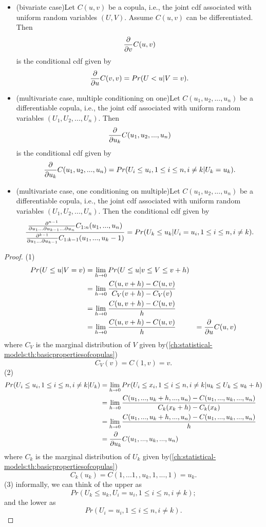 \begin{refsection}
\begin{theorem}\label{ch:statistical-models:th:partialDifferentialCopulaGivesConditionalDistributionForUniformRandomVariables}\cite[16]{schmitz2003copulas}
\begin{itemize}
	\item (bivariate case)Let $C(u,v)$ be a copula, i.e., the joint cdf  associated with uniform random variables $(U,V)$. Assume $C(u,v)$ can be differentiated. Then
	$$\frac{\partial}{\partial v}C(u,v)$$
	is the conditional cdf given by
	$$\frac{\partial}{\partial u}C(v,v) = Pr(U<u|V=v).$$
	\item (multivariate case, multiple conditioning on one)Let $C(u_1,u_2,...,u_n)$ be a differentiable copula, i.e., the joint cdf  associated with uniform random variables $(U_1,U_2,...,U_n)$. Then
	$$\frac{\partial}{\partial u_k}C(u_1,u_2,...,u_n)$$
	is the conditional cdf given by
	$$\frac{\partial}{\partial u_k}C(u_1,u_2,...,u_n) = Pr(U_i\leq u_i, 1\leq i\leq n,i\neq k|U_k=u_k).$$ 
	\item (multivariate case, one conditioning on multiple)Let $C(u_1,u_2,...,u_n)$ be a differentiable copula, i.e., the joint cdf  associated with uniform random variables $(U_1,U_2,...,U_n)$. Then
the conditional cdf given by
	$$\frac{\frac{\partial^{n-1}}{\partial u_1 ... \partial u_{k-1} ... \partial u_n} C_{1:n}(u_1,...,u_n)}{\frac{\partial^{k-1}}{\partial u_1 ... \partial u_{k-1}} C_{1:k-1}(u_1,...,u_k-1)} = Pr(U_k\leq u_k|U_i=u_i,1\leq i\leq n,i\neq k).$$
\end{itemize}
\end{theorem}
\begin{proof}
(1) 
\begin{align*}
Pr(U\leq u|V = v) &= \lim_{h\to 0} Pr(U\leq u|v\leq V \leq v+h) \\
&= \lim_{h\to 0} \frac{C(u,v+h) - C(u,v)}{C_V(v+h) - C_V(v)} \\
&= \lim_{h\to 0} \frac{C(u,v+h) - C(u,v)}{h} \\
&= \lim_{h\to 0} \frac{C(u,v+h) - C(u,v)}{h} 
& = \frac{\partial}{\partial u}C(u,v)
\end{align*}
where $C_V$ is the marginal distribution of $V$ given by(\autoref{ch:statistical-models:th:basicpropertiesofcopulas})
$$C_V(v) = C(1,v) = v.$$
(2)
\begin{align*}
Pr(U_i\leq u_i,1\leq i\leq n,i\neq k|U_k) &= \lim_{h\to 0} Pr(U_i\leq x_i,1\leq i\leq n,i\neq k|u_k\leq U_k \leq u_k+h) \\
&= \lim_{h\to 0} \frac{C(u_1,...,u_k+h,...,u_n) - C(u_1,...,u_k,...,u_n)}{C_{k}(x_k+h) - C_{k}(x_k)} \\
&= \lim_{h\to 0} \frac{C(u_1,...,u_k+h,...,u_n) - C(u_1,...,u_k,...,u_n)}{h} \\
&= \frac{\partial }{\partial u_k}C(u_1,...,u_k,...,u_n)
\end{align*}
where $C_k$ is the marginal distribution of $U_k$ given by(\autoref{ch:statistical-models:th:basicpropertiesofcopulas})
$$C_k(u_k) = C(1,...1,,u_k, 1,...,1) = u_k.$$
(3) informally, we can think of the upper as
$$Pr(U_k\leq u_k, U_i=u_i, 1\leq i\leq n,i\neq k);$$
and the lower as
$$Pr(U_i=u_i, 1\leq i\leq n,i\neq k).$$


\end{proof}
\end{refsection}

